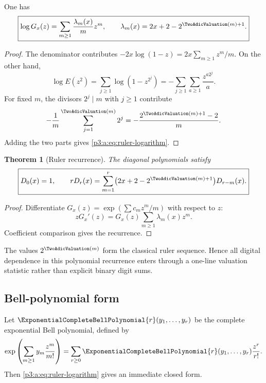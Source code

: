 \documentclass[11pt,oneside]{article}
\numberwithin{equation}{section}
\newtheorem{theorem}{Theorem}[section]
\theoremstyle{definition}
\theoremstyle{remark}
\begin{document}
\begin{lemma}
One has
\begin{equation}
 \boxed{
 \log G_x(z)=\sum_{m\ge1}
 \frac{\lambda_m(x)}{m}z^m,
 \qquad
 \lambda_m(x)=2x+2-2^{\TwoAdicValuation(m)+1}.}
 \label{p3:a:eq:ruler-logarithm}
\end{equation}
\end{lemma}

\begin{proof}
The denominator contributes
\(-2x\log(1-z)=2x\sum_{m\ge1}z^m/m\).  On the other hand,
\[
 \log E(z^2)
 =\sum_{j\ge1}\log(1-z^{2^j})
 =-\sum_{j\ge1}\sum_{a\ge1}\frac{z^{a2^j}}a.
\]
For fixed \(m\), the divisors \(2^j\mid m\) with \(j\ge1\) contribute
\[
 -\frac1m\sum_{j=1}^{\TwoAdicValuation(m)}2^j
 =-\frac{2^{\TwoAdicValuation(m)+1}-2}{m}.
\]
Adding the two parts gives \eqref{p3:a:eq:ruler-logarithm}.
\end{proof}

\begin{theorem}[Ruler recurrence]
The diagonal polynomials satisfy
\begin{equation}
 \boxed{
 D_0(x)=1,
 \qquad
 r D_r(x)=\sum_{m=1}^{r}
 \bigl(2x+2-2^{\TwoAdicValuation(m)+1}\bigr)D_{r-m}(x).}
 \label{p3:a:eq:ruler-recurrence}
\end{equation}
\end{theorem}

\begin{proof}
Differentiate \(G_x(z)=\exp(\sum c_mz^m/m)\) with respect to \(z\):
\[
 zG_x'(z)=G_x(z)\sum_{m\ge1}\lambda_m(x)z^m.
\]
Coefficient comparison gives the recurrence.
\end{proof}

The values \(2^{\TwoAdicValuation(m)}\) form the classical ruler sequence.  Hence all
digital dependence in this polynomial recurrence enters through a one-line
valuation statistic rather than explicit binary digit sums.

\subsection{Bell-polynomial form}

Let \(\ExponentialCompleteBellPolynomial{r}(y_1,\ldots,y_r)\) be the complete exponential Bell polynomial,
defined by
\begin{equation}
 \exp\left(\sum_{m\ge1}y_m\frac{z^m}{m!}\right)
 =\sum_{r\ge0}\ExponentialCompleteBellPolynomial{r}(y_1,\ldots,y_r)\frac{z^r}{r!}.
 \label{p3:a:eq:Bell-definition}
\end{equation}
Then \eqref{p3:a:eq:ruler-logarithm} gives an immediate closed form.
\end{document}
